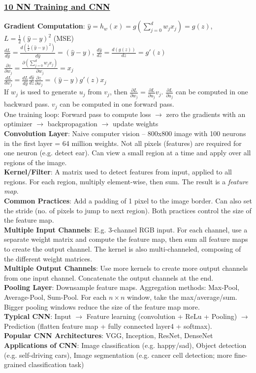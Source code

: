 \documentclass{article}
\begin{document}
{\begin{multicols*}{3}
\subsubsection*{\underline{10 NN Training and CNN}}
\textbf{Gradient Computation}: $\hat{y}=h_w(x)=g(\sum_{j=0}^dw_jx_j)=g(z)$, $L=\frac{1}{2}(\hat{y}-y)^2$ (MSE) \\
$\frac{dL}{d\hat{y}}=\frac{d(\frac{1}{2}(\hat{y}-y)^2)}{d\hat{y}}=(\hat{y}-y)$, $\frac{d\hat{y}}{dz}=\frac{d(g(z))}{dz}=g'(z)$\\
$\frac{\partial z}{\partial w_j}=\frac{\partial(\sum_{j=0}^dw_jx_j)}{\partial w_j}=x_j$\\
$\frac{dL}{dw_j}=\frac{dL}{d\hat{y}}\frac{d\hat{y}}{dz}\frac{\partial z}{\partial w_j}=(\hat{y}-y)g'(z)x_j$\\
If $w_j$ is used to generate $u_j$ from $v_j$, then $\frac{\partial L}{\partial w_j}=\frac{\partial L}{\partial u_j}v_j$. $\frac{\partial L}{\partial u_j}$ can be computed in one backward pass. $v_j$ can be computed in one forward pass. \\
One training loop: Forward pass to compute loss $\to$ zero the gradients with an optimizer $\to$ backpropagation $\to$ update weights\\
\textbf{Convolution Layer}: Naive computer vision – 800x800 image with 100 neurons in the first layer = 64 million weights. Not all pixels (features) are required for one neuron (e.g. detect ear). Can view a small region at a time and apply over all regions of the image. \\
\textbf{Kernel/Filter}: A matrix used to detect features from input, applied to all regions. For each region, multiply element-wise, then sum. The result is a \textit{feature map}. \\
\textbf{Common Practices}: Add a padding of 1 pixel to the image border. Can also set the stride (no. of pixels to jump to next region). Both practices control the size of the feature map.\\
\textbf{Multiple Input Channels}: E.g. 3-channel RGB input. For each channel, use a separate weight matrix and compute the feature map, then sum all feature maps to create the output channel. The kernel is also multi-channeled, composing of the different weight matrices. \\
\textbf{Multiple Output Channels}: Use more kernels to create more output channels from one input channel. Concatenate the output channels at the end.\\
\textbf{Pooling Layer}: Downsample feature maps. Aggregation methods: Max-Pool, Average-Pool, Sum-Pool. For each $n\times n$ window, take the max/average/sum. Bigger pooling windows reduce the size of the feature map more.\\
\textbf{Typical CNN}: Input $\to$ Feature learning (convolution + ReLu + Pooling) $\to$ Prediction (flatten feature map + fully connected layer4 + softmax). \\
\textbf{Popular CNN Architectures}: VGG, Inception, ResNet, DenseNet\\
\textbf{Applications of CNN}: Image classification (e.g. happy/sad), Object detection (e.g. self-driving cars), Image segmentation (e.g. cancer cell detection; more fine-grained classification task) 

\end{multicols*}}
\end{document}

